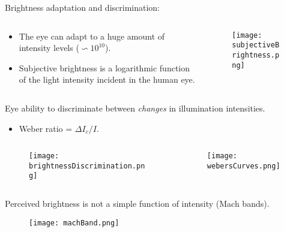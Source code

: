 \begin{frame}
Brightness adaptation and discrimination:
\begin{columns}
\begin{column}{.5\textwidth}
\begin{itemize}
\item The eye can adapt to a huge amount of intensity levels ($\backsim 10^{10}$).
\item Subjective brightness is a logarithmic function  of the light intensity incident in the human eye.
\end{itemize}
\end{column}
\begin{column}{.5\textwidth}
\begin{figure}
\texttt{[image: subjectiveBrightness.png]}
\end{figure}
\end{column}
\end{columns}
\end{frame}


\begin{frame}
Eye ability to discriminate between \textit{changes} in illumination intensities.
\begin{itemize}
\item Weber ratio = $\Delta I_{c}/I$.
\end{itemize}
\begin{columns}
\begin{column}{.5\textwidth}
\begin{figure}
\texttt{[image: brightnessDiscrimination.png]}
\end{figure}
\end{column}
\begin{column}{.5\textwidth}
\begin{figure}
\texttt{[image: webersCurves.png]}
\end{figure}
\end{column}
\end{columns}
\end{frame}


\begin{frame}
Perceived brightness is not a simple function of intensity (Mach bands).
\begin{figure}
\texttt{[image: machBand.png]}
\end{figure}
\end{frame}

